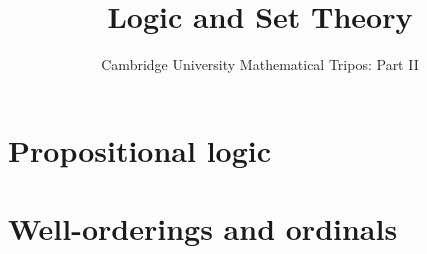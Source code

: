 \documentclass{article}
\title{Logic and Set Theory}
\author{Cambridge University Mathematical Tripos: Part II}
\begin{document}
\maketitle

\tableofcontentsnewpage{}

\section{Propositional logic}

\section{Well-orderings and ordinals}

\end{document}
